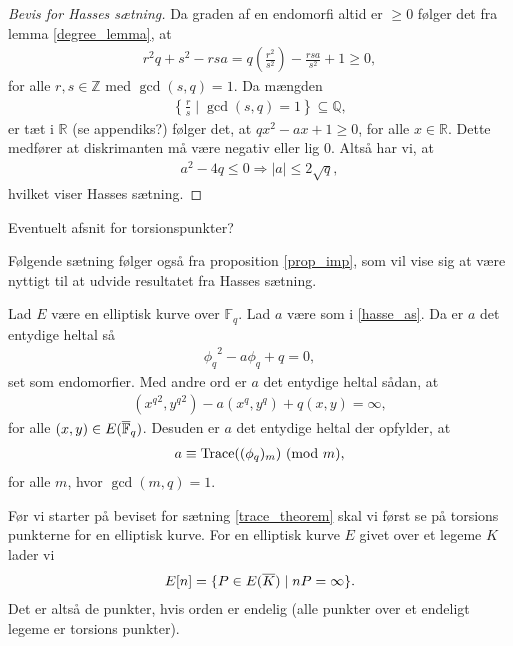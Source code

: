 \begin{proof}[Bevis for Hasses sætning]
Da graden af en endomorfi altid er $\geq 0$ følger det fra lemma \ref{degree_lemma}, at 
\begin{align*}
	r^2q+s^2 -rsa = q \left( \frac{r^2}{s^2} \right) - \frac{rsa}{s^2} + 1 
	\geq 0,
\end{align*}
for alle $r, s \in \mathbb{Z}$ med $\gcd(s, q)=1$. Da mængden
\begin{align*}
	\left\{ \frac{r}{s} \mid \gcd(s, q)=1 \right\} \subseteq \mathbb{Q},
\end{align*}
er tæt i $\mathbb{R}$ (se appendiks?) følger det, at $qx^2 - ax + 1 \geq 0$,
for alle $x \in \mathbb{R}$. Dette medfører at diskrimanten må være negativ eller lig $0$.
Altså har vi, at 
\begin{align*}
	a^2 - 4q \leq 0 \Rightarrow |a| \leq 2 \sqrt{q},
\end{align*}
hvilket viser Hasses sætning.
\end{proof}

Eventuelt afsnit for torsionspunkter?

Følgende sætning følger også fra proposition \ref{prop_imp}, som vil vise sig at være nyttigt til at udvide resultatet fra Hasses sætning.

\begin{theorem}
\label{trace_theorem}
Lad $E$ være en elliptisk kurve over $\mathbb{F}_q$. Lad $a$ være som i \eqref{hasse_as}. Da er $a$ det
entydige heltal så
\begin{align*}
	{\phi_q}^2 - a \phi_q + q = 0,
\end{align*}
set som endomorfier. Med andre ord er $a$ det entydige heltal sådan, at 
\begin{align*}
	({x^q}^2, {y^q}^2) - a(x^q, y^q) + q(x, y) = \infty,
\end{align*}
for alle $(x, y) \in E(\overline{\mathbb{F}}_q)$. Desuden er $a$ det entydige heltal der opfylder, at
\begin{align*}
	a \equiv \text{Trace}((\phi_q)_m) \ (\mathrm{mod} \ m),
\end{align*}
for alle $m$, hvor $\gcd(m, q)=1$.
\end{theorem}

Før vi starter på beviset for sætning \ref{trace_theorem} skal vi først se på torsions punkterne for en elliptisk kurve. For en elliptisk kurve $E$ givet over et legeme $K$ lader vi
\begin{align*}
	E[n] = \{ P \in E(\overline{K}) \mid nP= \infty \}.
\end{align*}
Det er altså de punkter, hvis orden er endelig (alle punkter over et endeligt legeme er torsions punkter). 

